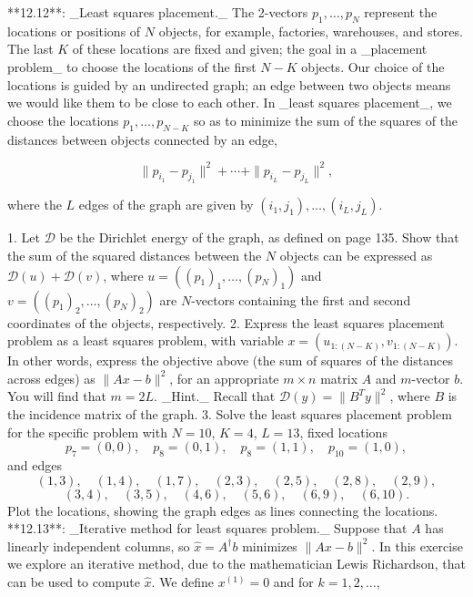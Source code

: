 

**12.12**: _Least squares placement._ The 2-vectors \(p_{1},\ldots,p_{N}\) represent the locations or positions of \(N\) objects, for example, factories, warehouses, and stores. The last \(K\) of these locations are fixed and given; the goal in a _placement problem_ to choose the locations of the first \(N-K\) objects. Our choice of the locations is guided by an undirected graph; an edge between two objects means we would like them to be close to each other. In _least squares placement_, we choose the locations \(p_{1},\ldots,p_{N-K}\) so as to minimize the sum of the squares of the distances between objects connected by an edge,

\[\|p_{i_{1}}-p_{j_{1}}\|^{2}+\cdots+\|p_{i_{L}}-p_{j_{L}}\|^{2},\]

where the \(L\) edges of the graph are given by \((i_{1},j_{1}),\ldots,(i_{L},j_{L})\).

1. Let \(\mathcal{D}\) be the Dirichlet energy of the graph, as defined on page 135. Show that the sum of the squared distances between the \(N\) objects can be expressed as \(\mathcal{D}(u)+\mathcal{D}(v)\), where \(u=((p_{1})_{1},\ldots,(p_{N})_{1})\) and \(v=((p_{1})_{2},\ldots,(p_{N})_{2})\) are \(N\)-vectors containing the first and second coordinates of the objects, respectively.
2. Express the least squares placement problem as a least squares problem, with variable \(x=(u_{1:(N-K)},v_{1:(N-K)})\). In other words, express the objective above (the sum of squares of the distances across edges) as \(\|Ax-b\|^{2}\), for an appropriate \(m\times n\) matrix \(A\) and \(m\)-vector \(b\). You will find that \(m=2L\). _Hint._ Recall that \(\mathcal{D}(y)=\|B^{T}y\|^{2}\), where \(B\) is the incidence matrix of the graph.
3. Solve the least squares placement problem for the specific problem with \(N=10\), \(K=4\), \(L=13\), fixed locations \[p_{7}=(0,0),\quad p_{8}=(0,1),\quad p_{8}=(1,1),\quad p_{10}=(1,0),\] and edges \[(1,3),\quad(1,4),\quad(1,7),\quad(2,3),\quad(2,5),\quad(2,8),\quad(2,9),\] \[(3,4),\quad(3,5),\quad(4,6),\quad(5,6),\quad(6,9),\quad(6,10).\] Plot the locations, showing the graph edges as lines connecting the locations.
**12.13**: _Iterative method for least squares problem._ Suppose that \(A\) has linearly independent columns, so \(\hat{x}=A^{\dagger}b\) minimizes \(\|Ax-b\|^{2}\). In this exercise we explore an iterative method, due to the mathematician Lewis Richardson, that can be used to compute \(\hat{x}\). We define \(x^{(1)}=0\) and for \(k=1,2,\ldots\),

